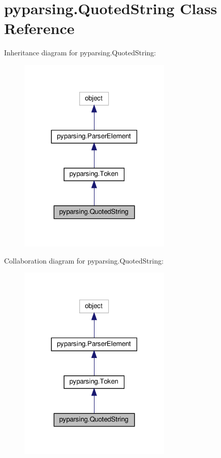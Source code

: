 \hypertarget{classpyparsing_1_1QuotedString}{}\section{pyparsing.\+Quoted\+String Class Reference}
\label{classpyparsing_1_1QuotedString}


Inheritance diagram for pyparsing.\+Quoted\+String\+:
\nopagebreak
\begin{figure}[H]
\begin{center}
\leavevmode
\includegraphics[width=206pt]{classpyparsing_1_1QuotedString__inherit__graph}
\end{center}
\end{figure}


Collaboration diagram for pyparsing.\+Quoted\+String\+:
\nopagebreak
\begin{figure}[H]
\begin{center}
\leavevmode
\includegraphics[width=206pt]{classpyparsing_1_1QuotedString__coll__graph}
\end{center}
\end{figure}
